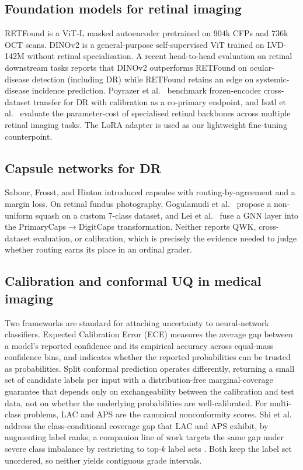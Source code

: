 \documentclass[journal]{IEEEtran}
\begin{document}
\subsection{Foundation models for retinal imaging}
RETFound \cite{ref:retfound} is a ViT-L masked autoencoder pretrained on $904$k CFPs and $736$k OCT scans. DINOv2 \cite{ref:dinov2} is a general-purpose self-supervised ViT trained on LVD-142M without retinal specialisation. A recent head-to-head evaluation on retinal downstream tasks \cite{ref:dinov2_vs_retfound} reports that DINOv2 outperforms RETFound on ocular-disease detection (including DR) while RETFound retains an edge on systemic-disease incidence prediction. Poyrazer et al.\ \cite{ref:dinov2_vs_retfound} benchmark frozen-encoder cross-dataset transfer for DR with calibration as a co-primary endpoint, and Isztl et al.\ \cite{ref:zoellin} evaluate the parameter-cost of specialised retinal backbones across multiple retinal imaging tasks. The LoRA adapter \cite{ref:lora} is used as our lightweight fine-tuning counterpoint.

\subsection{Capsule networks for DR}
Sabour, Frosst, and Hinton \cite{ref:sabour} introduced capsules with routing-by-agreement and a margin loss. On retinal fundus photography, Gogulamudi et al.\ \cite{ref:gogulamudi} propose a non-uniform squash on a custom 7-class dataset, and Lei et al.\ \cite{ref:gfcapsnet} fuse a GNN layer into the PrimaryCaps$\to$DigitCaps transformation. Neither reports QWK, cross-dataset evaluation, or calibration, which is precisely the evidence needed to judge whether routing earns its place in an ordinal grader.

\subsection{Calibration and conformal UQ in medical imaging}
Two frameworks are standard for attaching uncertainty to neural-network classifiers. Expected Calibration Error (ECE) \cite{ref:guo_calibration} measures the average gap between a model's reported confidence and its empirical accuracy across equal-mass confidence bins, and indicates whether the reported probabilities can be trusted as probabilities. Split conformal prediction \cite{ref:vovk_conformal} operates differently, returning a small set of candidate labels per input with a distribution-free marginal-coverage guarantee that depends only on exchangeability between the calibration and test data, not on whether the underlying probabilities are well-calibrated. For multi-class problems, LAC \cite{ref:sadinle} and APS \cite{ref:romano} are the canonical nonconformity scores. Shi et al.\ \cite{ref:rank_conformal} address the class-conditional coverage gap that LAC and APS exhibit, by augmenting label ranks; a companion line of work targets the same gap under severe class imbalance by restricting to top-$k$ label sets \cite{ref:kccp}. Both keep the label set unordered, so neither yields contiguous grade intervals.
\end{document}
